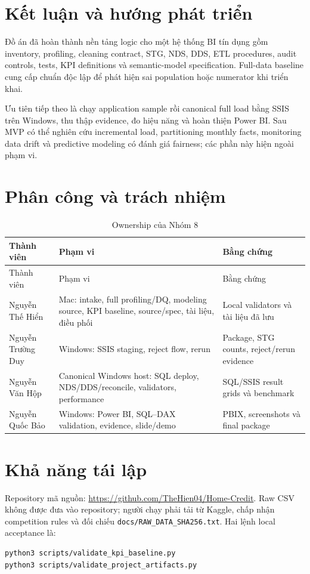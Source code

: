 \documentclass[12pt,a4paper,oneside]{report}
\begin{document}
\chapter{Kết luận và hướng phát triển}
Đồ án đã hoàn thành nền tảng logic cho một hệ thống BI tín dụng gồm inventory, profiling, cleaning contract, STG, NDS, DDS, ETL procedures, audit controls, tests, KPI definitions và semantic-model specification. Full-data baseline cung cấp chuẩn độc lập để phát hiện sai population hoặc numerator khi triển khai.

Ưu tiên tiếp theo là chạy application sample rồi canonical full load bằng SSIS trên Windows, thu thập evidence, đo hiệu năng và hoàn thiện Power BI. Sau MVP có thể nghiên cứu incremental load, partitioning monthly facts, monitoring data drift và predictive modeling có đánh giá fairness; các phần này hiện ngoài phạm vi.

\appendix
\chapter{Phân công và trách nhiệm}
\begin{longtable}{p{3.2cm}p{5.4cm}p{5.2cm}}
\caption{Ownership của Nhóm 8}\label{tab:team}\\
\toprule
Thành viên & Phạm vi & Bằng chứng \\
\midrule
\endfirsthead
\toprule Thành viên & Phạm vi & Bằng chứng \\
\midrule
\endhead
Nguyễn Thế Hiển & Mac: intake, full profiling/DQ, modeling source, KPI baseline, source/spec, tài liệu, điều phối & Local validators và tài liệu đã lưu \\
Nguyễn Trường Duy & Windows: SSIS staging, reject flow, rerun & Package, STG counts, reject/rerun evidence \\
Nguyễn Văn Hộp & Canonical Windows host: SQL deploy, NDS/DDS/reconcile, validators, performance & SQL/SSIS result grids và benchmark \\
Nguyễn Quốc Bảo & Windows: Power BI, SQL--DAX validation, evidence, slide/demo & PBIX, screenshots và final package \\
\bottomrule
\end{longtable}

\chapter{Khả năng tái lập}
Repository mã nguồn: \url{https://github.com/TheHien04/Home-Credit}. Raw CSV không được đưa vào repository; người chạy phải tải từ Kaggle, chấp nhận competition rules và đối chiếu \texttt{docs/RAW\_DATA\_SHA256.txt}. Hai lệnh local acceptance là:
\begin{verbatim}
python3 scripts/validate_kpi_baseline.py
python3 scripts/validate_project_artifacts.py
\end{verbatim}
\end{document}
